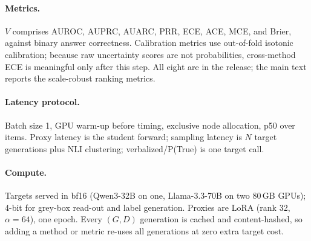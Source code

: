 \documentclass[11pt]{article}
\begin{document}
\paragraph{Metrics.} $V$ comprises AUROC, AUPRC, AUARC, PRR, ECE, ACE, MCE, and Brier,
against binary answer correctness. Calibration metrics use out-of-fold isotonic
calibration; because raw uncertainty scores are not probabilities, cross-method ECE is
meaningful only after this step. All eight are in the release; the main text reports the
scale-robust ranking metrics.
\paragraph{Latency protocol.} Batch size 1, GPU warm-up before timing, exclusive node
allocation, p50 over items. Proxy latency is the student forward; sampling latency is $N$
target generations plus NLI clustering; verbalized/P(True) is one target call.
\paragraph{Compute.} Targets served in bf16 (Qwen3-32B on one, Llama-3.3-70B on two 80\,GB
GPUs); 4-bit for grey-box read-out and label generation. Proxies are LoRA
(rank 32, $\alpha{=}64$), one epoch. Every $(G,D)$ generation is cached and content-hashed,
so adding a method or metric re-uses all generations at zero extra target cost.
\end{document}
